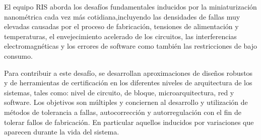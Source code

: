 El equipo RIS aborda los desafíos fundamentales inducidos por la miniaturización nanométrica cada vez más cotidiana,incluyendo las densidades de fallas muy elevadas causadas por el proceso de fabricación, tensiones de alimentación y temperaturas, el envejecimiento acelerado de los circuitos, las interferencias electromagnéticas y los errores de software como también las restricciones de bajo consumo.

Para contribuir a este desafío, se desarrollan aproximaciones de diseños robustos y de herramientas de certificación en los diferentes niveles de arquitectura de los sistemas, tales como: nivel de circuito, de bloque, microarquitectura, red y software. Los objetivos son múltiples y conciernen al desarrollo y  utilización de  métodos de tolerancia a fallas, autocorrección y autorregulación con el fin de tolerar  fallos de fabricación. En particular aquellos inducidos por variaciones que aparecen durante la vida del sistema.
